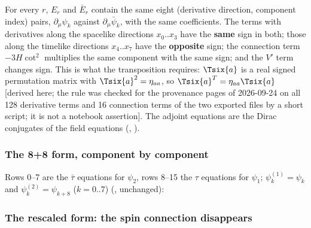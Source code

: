For every $r$, $E_r$ and $\bar E_r$ contain the same eight (derivative direction, component index)
pairs, $\partial_\mu\psi_k$ against $\partial_\mu\bar\psi_k$, with the same coefficients. The terms
with derivatives along the spacelike directions $x_0..x_3$ have the \textbf{same} sign in both; those
along the timelike directions $x_4..x_7$ have the \textbf{opposite} sign; the connection term
$-3H\cot^2$ multiplies the same component with the same sign; and the $V'$ term changes sign. This is
what the transposition requires: $\Tsix{a}$ is a real signed permutation matrix with
$\Tsix{a}^2=\eta_{aa}$, so $\Tsix{a}^{T}=\eta_{aa}\Tsix{a}$ [derived here; the rule was checked for
the provenance pages of  2026-09-24 on all 128 derivative terms and 16 connection terms of the two exported files by a short
script; it is not a notebook assertion]. The adjoint equations are the Dirac conjugates of the field
equations (, ).

\subsubsection{The 8+8 form, component by component}
\label{sec:3.4.6}

Rows 0--7 are the $\bar\tau$ equations for $\psi_2$, rows 8--15 the $\tau$ equations for $\psi_1$;
$\psi^{(1)}_k=\psi_k$ and $\psi^{(2)}_k=\psi_{k+8}$ ($k=0..7$)
(, unchanged):

{\small

}

\subsubsection{The rescaled form: the spin connection disappears}
\label{sec:3.4.7}

